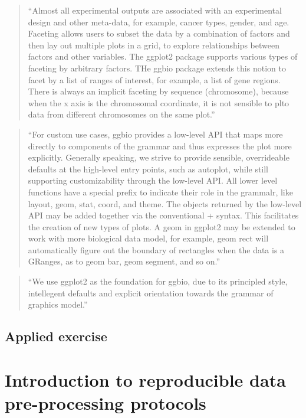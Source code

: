 \documentclass[]{tufte-book}
\begin{document}
\begin{quote}
``Almost all experimental outputs are associated with an experimental
design and other meta-data, for example, cancer types, gender, and age.
Faceting allows users to subset the data by a combination of factors and then
lay out multiple plots in a grid, to explore relationships between factors and
other variables. The ggplot2 package supports various types of faceting by
arbitrary factors. THe ggbio package extends this notion to facet by a list
of ranges of interest, for example, a list of gene regions. There is always
an implicit faceting by sequence (chromosome), because when the x axis is the
chromosomal coordinate, it is not sensible to plto data from different chromosomes
on the same plot.'' \citep{yin2012ggbio}
\end{quote}

\begin{quote}
``For custom use cases, ggbio provides a low-level API that maps more directly
to components of the grammar and thus expresses the plot more explicitly.
Generally speaking, we strive to provide sensible, overrideable defaults at the
high-level entry points, such as autoplot, while still supporting
customizability through the low-level API. All lower level functions have a
special prefix to indicate their role in the grammalr, like layout, geom,
stat, coord, and theme. The objects returned by the low-level API may be
added together via the conventional + syntax. This facilitates the creation of
new types of plots. A geom in ggplot2 may be extended to work with more
biological data model, for example, geom rect will automatically figure out the
boundary of rectangles when the data is a GRanges, as to geom bar, geom
segment, and so on.'' \citep{yin2012ggbio}
\end{quote}

\begin{quote}
``We use ggplot2 as the foundation for ggbio, due to its principled style,
intellegent defaults and explicit orientation towards the grammar of
graphics model.'' \citep{yin2012ggbio}
\citep{yin2012ggbio}
\end{quote}

\hypertarget{applied-exercise-6}{%
\subsection{Applied exercise}\label{applied-exercise-6}}

\hypertarget{module18}{%
\section{Introduction to reproducible data pre-processing protocols}\label{module18}}
\end{document}
